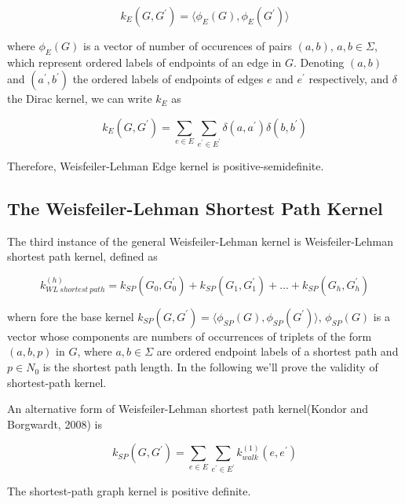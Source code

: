 \documentclass{llncs}
\begin{document}
\begin{equation}
k_E(G, G^{\prime}) = \langle \phi_E(G), \phi_E(G^{\prime}) \rangle
\end{equation}

where  $\phi_E(G)$ is a vector of number of occurences of pairs $(a, b)$, $a, b \in \Sigma$, which represent ordered labels of endpoints of an edge in $G$. Denoting $(a, b)$ and $(a^{\prime}, b^{\prime})$ the ordered labels of endpoints of edges $e$ and $e^{\prime}$ respectively, and $\delta$ the Dirac kernel, we can write $k_E$ as 

\begin{equation}
k_E(G, G^{\prime})  = \sum_{e\in E} \sum_{e^{\prime} \in E^{\prime}} \delta(a, a^{\prime}) \delta(b, b^{\prime})
\end{equation}

Therefore, Weisfeiler-Lehman Edge kernel is positive-semidefinite. 


%
\subsection{The Weisfeiler-Lehman Shortest Path Kernel}
%
The third instance of the general Weisfeiler-Lehman kernel is Weisfeiler-Lehman shortest path kernel, defined as 

\begin{equation}
k_{WL\ shortest\ path}^{(h)} = k_{SP}(G_0, G_0^{\prime}) + k_{SP}(G_1, G_1^{\prime}) + ... + k_{SP}(G_h, G_h^{\prime}) 
\end{equation}

whern fore the base kernel $k_{SP}(G, G^{\prime}) = \langle \phi_{SP}(G), \phi_{SP}(G^{\prime})\rangle$, $\phi_{SP}(G)$ is a vector whose components are numbers of occurrences of triplets of the form $(a, b, p)$ in $G$, where $a, b \in \Sigma$ are ordered endpoint labels of a shortest path and $p \in N_0$ is the shortest path length. In the following we'll prove the validity of shortest-path kernel.

An alternative form of Weisfeiler-Lehman shortest path kernel(Kondor and Borgwardt, 2008) is 

\begin{equation}
k_{SP}(G, G^{\prime}) = \sum_{e \in E} \sum_{e^{\prime} \in E^{\prime}} k_{walk}^{(1)} (e, e^{\prime})
\end{equation}

\begin{lemma}
The shortest-path graph kernel is positive definite.
\end{lemma}
\end{document}
